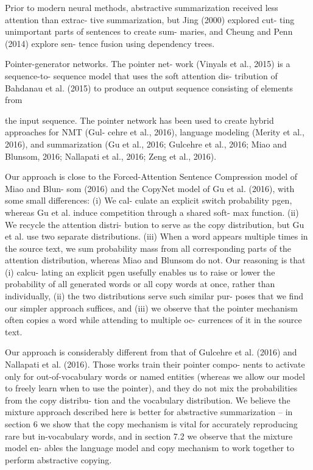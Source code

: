 \documentclass[UTF8]{ctexart}
\begin{document}
Prior to modern neural methods, abstractive
summarization received less attention than extrac-
tive summarization, but Jing (2000) explored cut-
ting unimportant parts of sentences to create sum-
maries, and Cheung and Penn (2014) explore sen-
tence fusion using dependency trees.

Pointer-generator networks. The pointer net-
work (Vinyals et al., 2015) is a sequence-to-
sequence model that uses the soft attention dis-
tribution of Bahdanau et al. (2015) to produce
an output sequence consisting of elements from

the input sequence. The pointer network has been
used to create hybrid approaches for NMT (Gul-
cehre et al., 2016), language modeling (Merity
et al., 2016), and summarization (Gu et al., 2016;
Gulcehre et al., 2016; Miao and Blunsom, 2016;
Nallapati et al., 2016; Zeng et al., 2016).


Our approach is close to the Forced-Attention
Sentence Compression model of Miao and Blun-
som (2016) and the CopyNet model of Gu et al.
(2016), with some small differences: (i) We cal-
culate an explicit switch probability pgen, whereas
Gu et al. induce competition through a shared soft-
max function. (ii) We recycle the attention distri-
bution to serve as the copy distribution, but Gu et
al. use two separate distributions. (iii) When a
word appears multiple times in the source text, we
sum probability mass from all corresponding parts
of the attention distribution, whereas Miao and
Blunsom do not. Our reasoning is that (i) calcu-
lating an explicit pgen usefully enables us to raise
or lower the probability of all generated words or
all copy words at once, rather than individually,
(ii) the two distributions serve such similar pur-
poses that we find our simpler approach suffices,
and (iii) we observe that the pointer mechanism
often copies a word while attending to multiple oc-
currences of it in the source text.


Our approach is considerably different from
that of Gulcehre et al. (2016) and Nallapati et al.
(2016). Those works train their pointer compo-
nents to activate only for out-of-vocabulary words
or named entities (whereas we allow our model to
freely learn when to use the pointer), and they do
not mix the probabilities from the copy distribu-
tion and the vocabulary distribution. We believe
the mixture approach described here is better for
abstractive summarization – in section 6 we show
that the copy mechanism is vital for accurately
reproducing rare but in-vocabulary words, and in
section 7.2 we observe that the mixture model en-
ables the language model and copy mechanism to
work together to perform abstractive copying.
\end{document}
